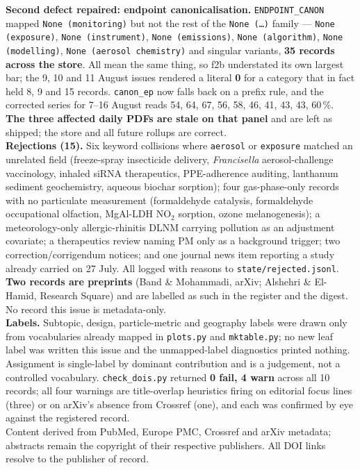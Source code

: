 \documentclass[10pt]{article}
\begin{document}
\begin{keybox}
{\textbf{Second defect repaired: endpoint canonicalisation.} \texttt{ENDPOINT\_CANON} mapped
\texttt{None (monitoring)} but not the rest of the \texttt{None (\ldots)} family ---
\texttt{None (exposure)}, \texttt{None (instrument)}, \texttt{None (emissions)},
\texttt{None (algorithm)}, \texttt{None (modelling)}, \texttt{None (aerosol chemistry)} and
singular variants, \textbf{35 records across the store}. All mean the same thing, so f2b
understated its own largest bar; the 9, 10 and 11 August issues rendered a literal
\textbf{0} for a category that in fact held 8, 9 and 15 records. \texttt{canon\_ep} now
falls back on a prefix rule, and the corrected series for 7--16 August reads
54, 64, 67, 56, 58, 46, 41, 43, 43, 60\,\%. \textbf{The three affected daily PDFs are stale
on that panel} and are left as shipped; the store and all future rollups are
correct.\\[0.8mm]
\textbf{Rejections (15).} Six keyword collisions where \texttt{aerosol} or
\texttt{exposure} matched an unrelated field (freeze-spray insecticide delivery,
\textit{Francisella} aerosol-challenge vaccinology, inhaled siRNA therapeutics,
PPE-adherence auditing, lanthanum sediment geochemistry, aqueous biochar sorption); four
gas-phase-only records with no particulate measurement (formaldehyde catalysis,
formaldehyde occupational olfaction, MgAl-LDH NO$_2$ sorption, ozone melanogenesis); a
meteorology-only allergic-rhinitis DLNM carrying pollution as an adjustment covariate; a
therapeutics review naming PM only as a background trigger; two correction/corrigendum
notices; and one journal news item reporting a study already carried on 27 July. All logged
with reasons to \texttt{state/rejected.jsonl}.\\[0.8mm]
\textbf{Two records are preprints} (Band \& Mohammadi, arXiv; Alshehri \& El-Hamid,
Research Square) and are labelled as such in the register and the digest. No record this
issue is metadata-only.\\[0.8mm]
\textbf{Labels.} Subtopic, design, particle-metric and geography labels were drawn only
from vocabularies already mapped in \texttt{plots.py} and \texttt{mktable.py}; no new leaf
label was written this issue and the unmapped-label diagnostics printed nothing.
Assignment is single-label by dominant contribution and is a judgement, not a controlled
vocabulary. \texttt{check\_dois.py} returned \textbf{0 fail, 4 warn} across all 10 records;
all four warnings are title-overlap heuristics firing on editorial focus lines (three) or
on arXiv's absence from Crossref (one), and each was confirmed by eye against the
registered record.\\[0.8mm]
Content derived from PubMed, Europe PMC, Crossref and arXiv metadata; abstracts remain the
copyright of their respective publishers. All DOI links resolve to the publisher of record.\par}
\end{keybox}
\end{document}
